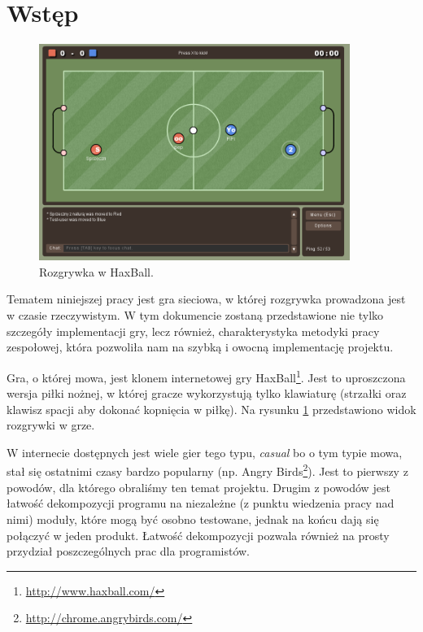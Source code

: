 \section{Wstęp}

\begin{figure}[ht]
    \centering
    \includegraphics[width=0.9\textwidth]{imgs/haxball.png}
    \caption{Rozgrywka w HaxBall.}
    \label{fig:haxball}
\end{figure}

Tematem niniejszej pracy jest gra sieciowa, w której rozgrywka prowadzona jest w czasie rzeczywistym. W tym dokumencie zostaną przedstawione nie tylko szczegóły implementacji gry, lecz również, charakterystyka metodyki pracy zespołowej, która pozwoliła nam na szybką i owocną implementację projektu.

Gra, o której mowa, jest klonem internetowej gry HaxBall\footnote{\url{http://www.haxball.com/}}. Jest to uproszczona wersja piłki nożnej, w której gracze wykorzystują tylko klawiaturę (strzałki oraz klawisz spacji aby dokonać kopnięcia w piłkę). Na rysunku \ref{fig:haxball} przedstawiono widok rozgrywki w grze.

W internecie dostępnych jest wiele gier tego typu, \emph{casual} bo o tym typie mowa, stał się ostatnimi czasy bardzo popularny (np. Angry Birds\footnote{\url{http://chrome.angrybirds.com/}}). Jest to pierwszy z powodów, dla którego obraliśmy ten temat projektu. Drugim z powodów jest łatwość dekompozycji programu na niezależne (z punktu wiedzenia pracy nad nimi) moduły, które mogą być osobno testowane, jednak na końcu dają się połączyć w jeden produkt. Łatwość dekompozycji pozwala również na prosty przydział poszczególnych prac dla programistów.





